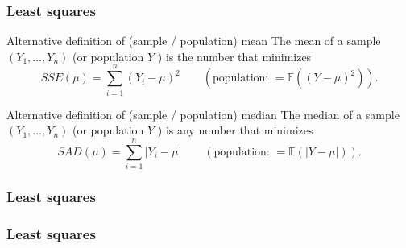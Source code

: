 \documentclass[handout]{beamer}
\newcommand{\Ee}{\mathbb{E}}
\begin{document}

   \begin{frame} \frametitle{Least squares}

   \begin{block}
   {Alternative definition of (sample / population) mean}
   The mean of a sample $(Y_1, \dots, Y_n)$ (or population $Y$ ) is the number that minimizes
   $$
   SSE(\mu) = \sum_{i=1}^n (Y_i - \mu)^2 \qquad \left(\text{population: \ } = \Ee((Y-\mu)^2) \right).$$
   \end{block}
   \begin{block}
   {Alternative definition of (sample / population) median}
   The median of a sample $(Y_1, \dots, Y_n)$ (or population $Y$ ) is any number that minimizes
   $$
   SAD(\mu) = \sum_{i=1}^n |Y_i - \mu| \qquad \left(\text{population: \ } = \Ee(|Y-\mu|) \right).$$
   \end{block}
   \end{frame}



   \begin{frame}
   \frametitle{Least squares}
   \begin{center}
   \end{center}

   \end{frame}



   \begin{frame}
   \frametitle{Least squares}
   \begin{center}
   \end{center}

   \end{frame}
\end{document}
